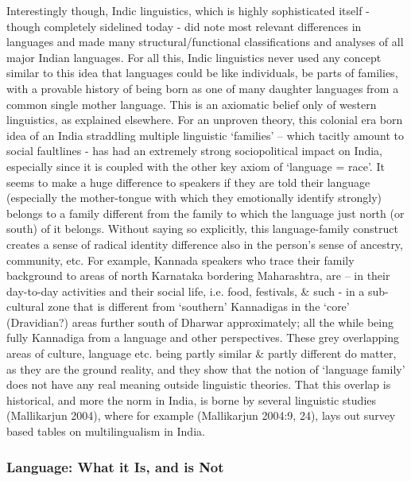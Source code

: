 Interestingly though, Indic linguistics, which is highly sophisticated itself - though completely sidelined today - did note most relevant differences in languages and made many structural/functional classifications and analyses of all major Indian languages. For all this, Indic linguistics never used any concept similar to this idea that languages could be like individuals, be parts of families, with a provable history of being born as one of many daughter languages from a common single mother language. This is an axiomatic belief only of western linguistics, as explained elsewhere. For an unproven theory, this colonial era born idea of an India straddling multiple linguistic ‘families’ – which tacitly amount to social faultlines - has had an extremely strong sociopolitical impact on India, especially since it is coupled with the other key axiom of ‘language = race’. It seems to make a huge difference to speakers if they are told their language (especially the mother-tongue with which they emotionally identify strongly) belongs to a family different from the family to which the language just north (or south) of it belongs. Without saying so explicitly, this language-family construct creates a sense of radical identity difference also in the person’s sense of ancestry, community, etc. For example, Kannada speakers who trace their family background to areas of north Karnataka bordering Maharashtra, are – in their day-to-day activities and their social life, i.e. food, festivals, \& such - in a sub-cultural zone that is different from ‘southern’ Kannadigas in the ‘core’ (Dravidian?) areas further south of Dharwar approximately; all the while being fully Kannadiga from a language and other perspectives. These grey overlapping areas of culture, language etc. being partly similar \& partly different do matter, as they are the ground reality, and they show that the notion of ‘language family’ does not have any real meaning outside linguistic theories. That this overlap is historical, and more the norm in India, is borne by several linguistic studies (Mallikarjun 2004), where for example (Mallikarjun 2004:9, 24), lays out survey based tables on multilingualism in India.


\subsubsection*{Language: What it Is, and is Not}

